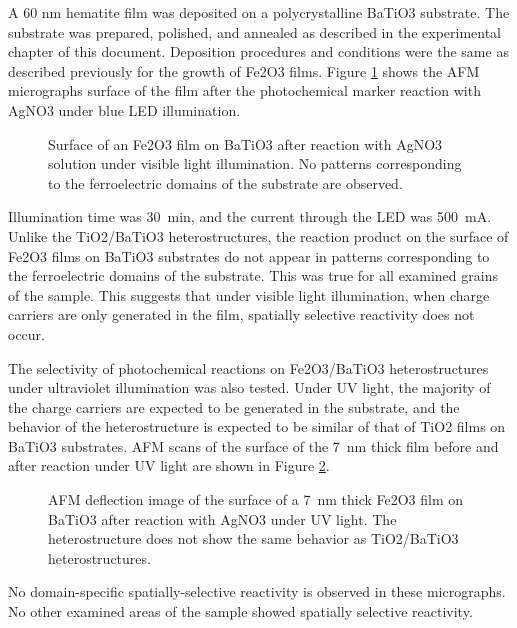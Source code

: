 \documentclass[12pt,%
              twoside,
               letterpaper]{uiothesis}
\begin{document}
A 60 nm hematite film was deposited on a polycrystalline BaTiO3 substrate. The substrate was prepared, polished, and annealed as described in the experimental chapter of this document. Deposition procedures and conditions were the same as described previously for the growth of Fe2O3 films. Figure \ref{fig:btoblue} shows the AFM micrographs surface of the film after the photochemical marker reaction with AgNO3 under blue LED illumination. 
\begin{figure}[htbp]
\begin{center}
\caption[Surface of an Fe2O3 film on BaTiO3 after reaction]{Surface of an Fe2O3 film on BaTiO3 after reaction with AgNO3 solution under visible light illumination. No patterns corresponding to the ferroelectric domains of the substrate are observed.}
\label{fig:btoblue} %
\end{center}
\end{figure}
Illumination time was \SI{30}{\minute}, and the current through the LED was \SI{500}{\milli\ampere}. Unlike the TiO2/BaTiO3 heterostructures, the reaction product on the surface of Fe2O3 films on BaTiO3 substrates do not appear in patterns corresponding to the ferroelectric domains of the substrate. This was true for all examined grains of the sample. This suggests that under visible light illumination, when charge carriers are only generated in the film, spatially selective reactivity does not occur.

The selectivity of photochemical reactions on Fe2O3/BaTiO3 heterostructures under ultraviolet illumination was also tested. Under UV light, the majority of the charge carriers are expected to be generated in the substrate, and the behavior of the heterostructure is expected to be similar of that of TiO2 films on BaTiO3 substrates. AFM scans of the surface of the \SI{7}{\nano\meter} thick film before and after reaction under UV light are shown in Figure \ref{fig:btouv}.
\begin{figure}[htbp]
\begin{center}
\caption[AFM deflection image reaction on \SI{7}{\nano\meter} thick Fe2O3 film]{AFM deflection image of the surface of a \SI{7}{\nano\meter} thick Fe2O3 film on BaTiO3 after reaction with AgNO3 under UV light. The heterostructure does not show the same behavior as TiO2/BaTiO3 heterostructures.}
\label{fig:btouv} %
\end{center}
\end{figure}
No domain-specific spatially-selective reactivity is observed in these micrographs. No other examined areas of the sample showed spatially selective reactivity.
\end{document}
